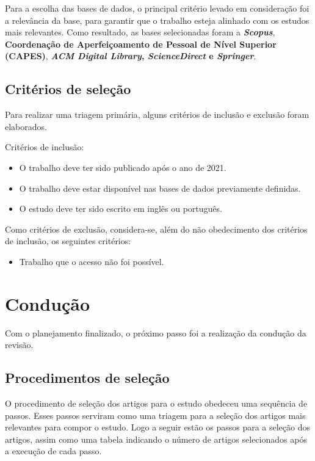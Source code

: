 Para a escolha das bases de dados, o principal critério levado em consideração foi a relevância da base, para garantir que o trabalho esteja alinhado com os estudos mais relevantes. Como resultado, as bases selecionadas foram a \textbf{\textit{Scopus}}, \textbf{Coordenação de Aperfeiçoamento de Pessoal de Nível Superior (CAPES)}, \textbf{\textit{ACM Digital Library}, \textbf{\textit{ScienceDirect}} e \textbf{\textit{Springer}}}.

\subsection{Critérios de seleção}

Para realizar uma triagem primária, alguns critérios de inclusão e exclusão foram elaborados.

Critérios de inclusão:
\begin{itemize}
	\item O trabalho deve ter sido publicado após o ano de 2021.
	
	\item O trabalho deve estar disponível nas bases de dados previamente definidas.
	
	\item O estudo deve ter sido escrito em inglês ou português.
	
\end{itemize}

Como critérios de exclusão, considera-se, além do não obedecimento dos critérios de inclusão, os seguintes critérios:
\begin{itemize}
	\item Trabalho que o acesso não foi possível.
\end{itemize}

\section{Condução}

Com o planejamento finalizado, o próximo passo foi a realização da condução da revisão.

\subsection{Procedimentos de seleção}

O procedimento de seleção dos artigos para o estudo obedeceu uma sequência de passos. Esses passos serviram como uma triagem para a seleção dos artigos mais relevantes para compor o estudo. Logo a seguir estão os passos para a seleção dos artigos, assim como uma tabela indicando o número de artigos selecionados após a execução de cada passo.

